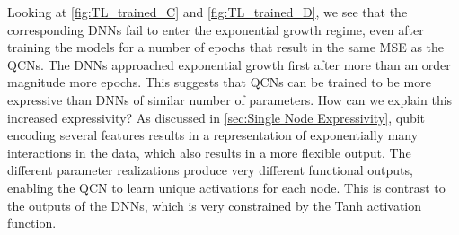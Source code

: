 Looking at \cref{fig:TL_trained_C} and \cref{fig:TL_trained_D}, we see that the corresponding DNNs fail to enter the exponential growth regime, even after training the models for a number of epochs that result in the same MSE as the QCNs. The DNNs approached exponential growth first after more than an order magnitude more epochs. This suggests that QCNs can be trained to be more expressive than DNNs of similar number of parameters. How can we explain this increased expressivity? As discussed in \cref{sec:Single Node Expressivity}, qubit encoding several features results in a representation of exponentially many interactions in the data, which also results in a more flexible output. The different parameter realizations produce very different functional outputs, enabling the QCN to learn unique activations for each node. This is contrast to the outputs of the DNNs, which is very constrained by the Tanh activation function. 


